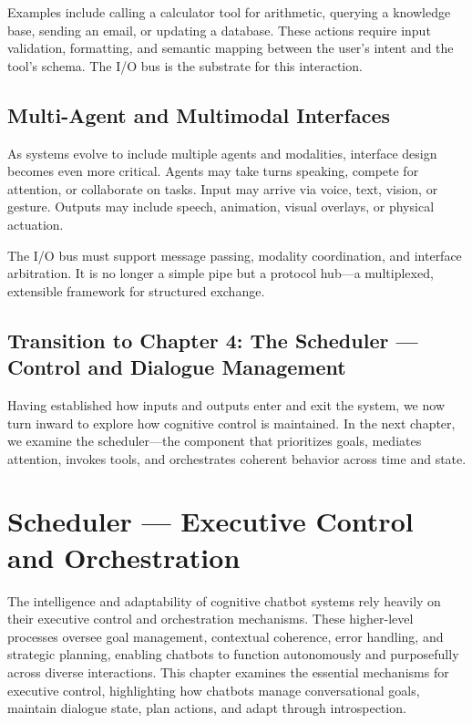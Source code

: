 \documentclass{book}
\begin{document}
Examples include calling a calculator tool for arithmetic, querying a knowledge base, sending an email, or updating a database. These actions require input validation, formatting, and semantic mapping between the user’s intent and the tool’s schema. The I/O bus is the substrate for this interaction.

\section{Multi-Agent and Multimodal Interfaces}

As systems evolve to include multiple agents and modalities, interface design becomes even more critical. Agents may take turns speaking, compete for attention, or collaborate on tasks. Input may arrive via voice, text, vision, or gesture. Outputs may include speech, animation, visual overlays, or physical actuation.

The I/O bus must support message passing, modality coordination, and interface arbitration. It is no longer a simple pipe but a protocol hub—a multiplexed, extensible framework for structured exchange.

\section*{Transition to Chapter 4: The Scheduler — Control and Dialogue Management}

Having established how inputs and outputs enter and exit the system, we now turn inward to explore how cognitive control is maintained. In the next chapter, we examine the scheduler—the component that prioritizes goals, mediates attention, invokes tools, and orchestrates coherent behavior across time and state.


\chapter{Scheduler — Executive Control and Orchestration}

The intelligence and adaptability of cognitive chatbot systems rely heavily on their executive control and orchestration mechanisms. These higher-level processes oversee goal management, contextual coherence, error handling, and strategic planning, enabling chatbots to function autonomously and purposefully across diverse interactions. This chapter examines the essential mechanisms for executive control, highlighting how chatbots manage conversational goals, maintain dialogue state, plan actions, and adapt through introspection.
\end{document}
